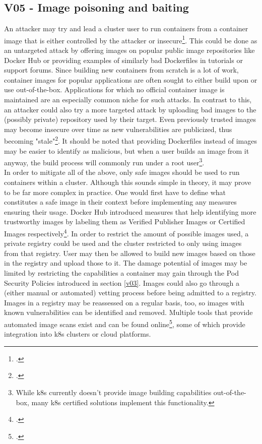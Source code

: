 \subsection{V05 - Image poisoning and baiting} \label{v05}
An attacker may try and lead a cluster user to run containers from a container image that is either controlled by the attacker or insecure\footcite[][, p. 13 to 14]{nistK8s}.
This could be done as an untargeted attack by offering images on popular public image repositories like Docker Hub or providing examples of similarly bad Dockerfiles in tutorials or support forums.
Since building new containers from scratch is a lot of work, container images for popular applications are often sought to either build upon or use out-of-the-box.
Applications for which no official container image is maintained are an especially common niche for such attacks.
In contrast to this, an attacker could also try a more targeted attack by uploading bad images to the (possibly private) repository used by their target.
Even previously trusted images may become insecure over time as new vulnerabilities are publicized, thus becoming "stale"\footcite[][, p. 14]{nistK8s}.
It should be noted that providing Dockerfiles instead of images may be easier to identify as malicious, but when a user builds an image from it anyway, the build process will commonly run under a root user\footnote{While \gls{k8s} currently doesn't provide image building capabilities out-of-the-box, many \gls{k8s} certified solutions implement this functionality.}. \\
In order to mitigate all of the above, only safe images should be used to run containers within a cluster. Although this sounds simple in theory, it may prove to be far more complex in practice. One would first have to define what constitutes a safe image in their context before implementing any measures ensuring their usage.
Docker Hub introduced measures that help identifying more trustworthy images by labeling them as Verified Publisher Images or Certified Images respectively\footcite[][, sections 'Verified Publisher Images and Plugins' and 'Certified Images and Plugins']{safeImagesDockerhub}.
In order to restrict the amount of possible images used, a private registry could be used and the cluster restricted to only using images from that registry. User may then be allowed to build new images based on those in the registry and upload those to it. 
The damage potential of images may be limited by restricting the capabilities a container may gain through the Pod Security Policies introduced in section \ref{v03}.
Images could also go through a (either manual or automated) vetting process before being admitted to a registry. Images in a registry may be reassessed on a regular basis, too, so images with known vulnerabilities can be identified and removed. Multiple tools that provide automated image scans exist and can be found online\footcite[][, section 'Securing your container images']{k8sBookWebsite}, some of which provide integration into \gls{k8s} clusters or cloud platforms.


